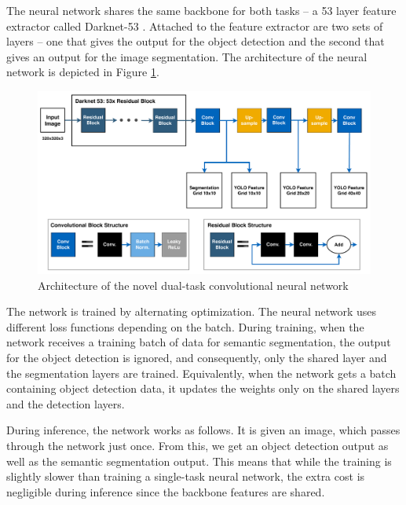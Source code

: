 \documentclass{ctuthesis/ctuthesis}
\begin{document}
The neural network shares the same backbone for both tasks -- a 53 layer feature extractor called Darknet-53 \cite{YOLOv3}. Attached to the feature extractor are two sets of layers -- one that gives the output for the object detection and the second that gives an output for the image segmentation. The architecture of the neural network is depicted in Figure \ref{f:dual_task}.\par


\begin{figure}[]
    \centering
    \includegraphics[width=1\textwidth]{images/network_architecture.pdf}
    
    \caption{Architecture of the novel dual-task convolutional neural network}\label{f:dual_task}
\end{figure}



The network is trained by alternating optimization. The neural network uses different loss functions depending on the batch. During training, when the network receives a training batch of data for semantic segmentation, the output for the object detection is ignored, and consequently, only the shared layer and the segmentation layers are trained. Equivalently, when the network gets a batch containing object detection data, it updates the weights only on the shared layers and the detection layers. \par


During inference, the network works as follows. It is given an image, which passes through the network just once. From this, we get an object detection output as well as the semantic segmentation output. This means that while the training is slightly slower than training a single-task neural network, the extra cost is negligible during inference since the backbone features are shared. \par
\end{document}
